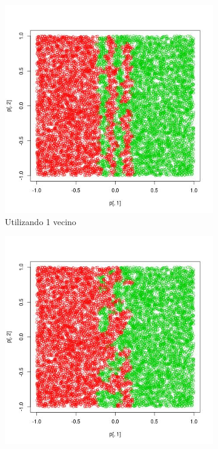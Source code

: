 \documentclass[12pt, a4paper]{article}
\begin{document}
\bigskip

\begin{figure}
    \centering

    \begin{subfigure}[b]{0.45\textwidth}
        \includegraphics[width=\textwidth]{predE1}
        \caption{Utilizando 1 vecino}
    \end{subfigure}
    \begin{subfigure}[b]{0.45\textwidth}
        \includegraphics[width=\textwidth]{predE10}

\end{subfigure}
\end{figure}
\end{document}
